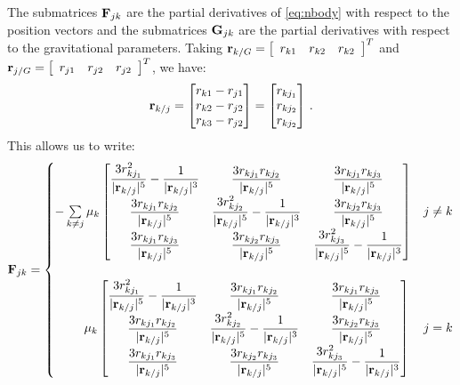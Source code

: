 The submatrices $\mathbf F_{jk}$ are the partial derivatives of \ref{eq:nbody} with respect to the position vectors and the submatrices $\mathbf G_{jk}$ are the partial derivatives with respect to the gravitational parameters. Taking $\mathbf r_{k/G} =  \left[ \begin{array}{ccc} r_{k1} & r_{k2} & r_{k2} \end{array}\right]^T$ and $\mathbf r_{j/G} =  \left[ \begin{array}{ccc} r_{j1} & r_{j2} & r_{j2} \end{array}\right]^T$, we have:
\begin{equation}
\mathbf r_{k/j} =  \begin{bmatrix} r_{k1} - r_{j1} \\ r_{k2} - r_{j2} \\ r_{k3} - r_{j2} \end{bmatrix}= \begin{bmatrix} r_{kj_1} \\ r_{kj_2} \\ r_{kj_2} \end{bmatrix} \,.
\end{equation} 
This allows us to write:
\begin{equation}
\mathbf F_{jk} =
\begin{cases}
  - \sum\limits_{k \ne j} \mu_k \begin{bmatrix}
\dfrac{3r_{kj_1}^2}{\vert \mathbf{r}_{k/j} \vert^5} - \dfrac{1}{\vert \mathbf{r}_{k/j} \vert^3} & \dfrac{3r_{kj_1}r_{kj_2}}{\vert \mathbf{r}_{k/j} \vert^5} & \dfrac{3r_{kj_1}r_{kj_3}}{\vert \mathbf{r}_{k/j} \vert^5}\\
\dfrac{3r_{kj_1}r_{kj_2}}{\vert \mathbf{r}_{k/j} \vert^5}  &  \dfrac{3r_{kj_2}^2}{\vert \mathbf{r}_{k/j} \vert^5} - \dfrac{1}{\vert \mathbf{r}_{k/j} \vert^3}  & \dfrac{3r_{kj_2}r_{kj_3}}{\vert \mathbf{r}_{k/j} \vert^5}\\
\dfrac{3r_{kj_1}r_{kj_3}}{\vert \mathbf{r}_{k/j} \vert^5} &  \dfrac{3r_{kj_2}r_{kj_3}}{\vert \mathbf{r}_{k/j} \vert^5} & \dfrac{3r_{kj_3}^2}{\vert \mathbf{r}_{k/j} \vert^5} - \dfrac{1}{\vert \mathbf{r}_{k/j} \vert^3}  \end{bmatrix} &
j \ne k \\\\
\hspace{5.5ex} \mu_k \begin{bmatrix}
\dfrac{3r_{kj_1}^2}{\vert \mathbf{r}_{k/j} \vert^5} - \dfrac{1}{\vert \mathbf{r}_{k/j} \vert^3} & \dfrac{3r_{kj_1}r_{kj_2}}{\vert \mathbf{r}_{k/j} \vert^5} & \dfrac{3r_{kj_1}r_{kj_3}}{\vert \mathbf{r}_{k/j} \vert^5}\\
\dfrac{3r_{kj_1}r_{kj_2}}{\vert \mathbf{r}_{k/j} \vert^5}  &  \dfrac{3r_{kj_2}^2}{\vert \mathbf{r}_{k/j} \vert^5} - \dfrac{1}{\vert \mathbf{r}_{k/j} \vert^3}  & \dfrac{3r_{kj_2}r_{kj_3}}{\vert \mathbf{r}_{k/j} \vert^5}\\
\dfrac{3r_{kj_1}r_{kj_3}}{\vert \mathbf{r}_{k/j} \vert^5} &  \dfrac{3r_{kj_2}r_{kj_3}}{\vert \mathbf{r}_{k/j} \vert^5} & \dfrac{3r_{kj_3}^2}{\vert \mathbf{r}_{k/j} \vert^5} - \dfrac{1}{\vert \mathbf{r}_{k/j} \vert^3}  \end{bmatrix} & j = k
\end{cases}
\end{equation}
